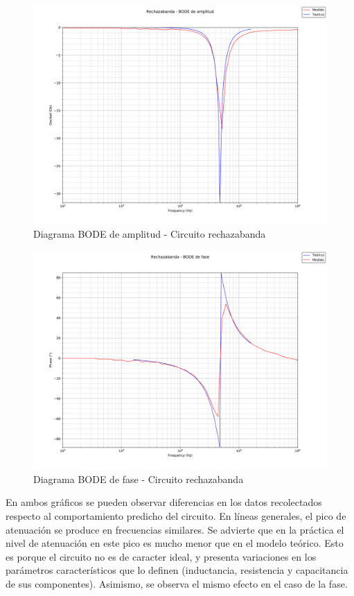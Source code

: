 \begin{figure}[H]
	\centering
	\includegraphics[scale=0.3]{./Recursos/ej4/rechazabanda_amplitud.png}
	\caption{Diagrama BODE de amplitud - Circuito rechazabanda}
\end{figure}

\begin{figure}[H]
	\centering
	\includegraphics[scale=0.3]{./Recursos/ej4/rechazabanda_fase.png}
	\caption{Diagrama BODE de fase - Circuito rechazabanda}
\end{figure}

En ambos gr\'aficos se pueden observar diferencias en los datos recolectados respecto al comportamiento predicho del circuito. En l\'ineas generales, el pico de atenuaci\'on se produce en frecuencias similares. Se advierte que en la pr\'actica el nivel de atenuaci\'on en este pico es mucho menor que en el modelo te\'orico. Esto es porque el circuito no es de caracter ideal, y presenta variaciones en los par\'ametros caracter\'isticos que lo definen (inductancia, resistencia y capacitancia de sus componentes). Asimismo, se observa el mismo efecto en el caso de la fase. 
